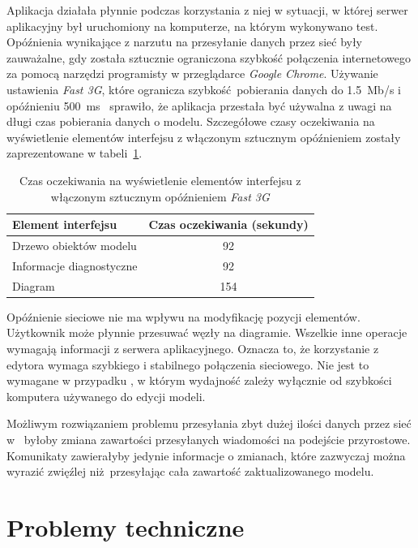 Aplikacja działała płynnie podczas korzystania z niej w sytuacji, w której
serwer aplikacyjny był uruchomiony na komputerze, na którym wykonywano test.
Opóźnienia wynikające z narzutu na przesyłanie danych przez sieć były
zauważalne, gdy została sztucznie ograniczona szybkość połączenia internetowego
za pomocą narzędzi programisty w przeglądarce \emph{Google Chrome}.
Używanie ustawienia \emph{Fast 3G}, które ogranicza szybkość pobierania danych
do 1.5~Mb/s i opóźnieniu
500~ms~\cite{network-throttling-profiles-stackoverflow} sprawiło, że aplikacja
przestała być używalna z uwagi na długi czas pobierania danych o modelu.
Szczegółowe czasy oczekiwania na wyświetlenie elementów interfejsu z włączonym
sztucznym opóźnieniem zostały zaprezentowane w
tabeli~\ref{tab:sirius-web-ui-delay-throttled}.

\begin{table}[!t]
	\centering
	\begin{tabular}{p{5cm}c}
		\toprule
		Element interfejsu       & Czas oczekiwania (sekundy) \\
		\midrule
		Drzewo obiektów modelu   & 92                         \\
		Informacje diagnostyczne & 92                         \\
		Diagram                  & 154                        \\
		\bottomrule
	\end{tabular}
	\caption{Czas oczekiwania na wyświetlenie elementów interfejsu
		\SiriusWeb{} z włączonym sztucznym opóźnieniem \emph{Fast
			3G}}\label{tab:sirius-web-ui-delay-throttled}
\end{table}

Opóźnienie sieciowe nie ma wpływu na modyfikację pozycji elementów. Użytkownik
może płynnie przesuwać węzły na diagramie. Wszelkie inne operacje wymagają
informacji z serwera aplikacyjnego. Oznacza to, że korzystanie z edytora
\SiriusWeb{} wymaga szybkiego i stabilnego połączenia sieciowego. Nie jest
to wymagane w przypadku \SiriusDesktop{}, w którym wydajność zależy
wyłącznie od szybkości komputera używanego do edycji modeli.

Możliwym rozwiązaniem problemu przesyłania zbyt dużej ilości danych przez sieć
w~\SiriusWeb{} byłoby zmiana zawartości przesyłanych wiadomości na
podejście przyrostowe. Komunikaty zawierałyby jedynie informacje o zmianach,
które zazwyczaj można wyrazić zwięźlej niż~przesyłając cała zawartość
zaktualizowanego modelu.

\section{Problemy techniczne}

